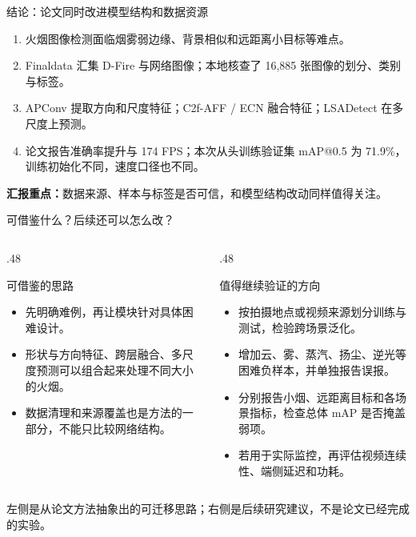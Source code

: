 \documentclass[aspectratio=169,10pt]{ctexbeamer}
\begin{document}
\begin{frame}{结论：论文同时改进模型结构和数据资源}
\begin{enumerate}
\item 火烟图像检测面临烟雾弱边缘、背景相似和远距离小目标等难点。
\item Finaldata 汇集 D-Fire 与网络图像；本地核查了 16,885 张图像的划分、类别与标签。
\item APConv 提取方向和尺度特征；C2f-AFF / ECN 融合特征；LSADetect 在多尺度上预测。
\item 论文报告准确率提升与 174 FPS；本次从头训练验证集 mAP@0.5 为 71.9\%，训练初始化不同，速度口径也不同。
\end{enumerate}
\vspace{.25cm}\textbf{汇报重点：}数据来源、样本与标签是否可信，和模型结构改动同样值得关注。
\end{frame}

\begin{frame}{可借鉴什么？后续还可以怎么改？}
\begin{columns}[T,onlytextwidth]
\begin{column}{.48\textwidth}
\begin{block}{可借鉴的思路}
\begin{itemize}
\item 先明确难例，再让模块针对具体困难设计。
\item 形状与方向特征、跨层融合、多尺度预测可以组合起来处理不同大小的火烟。
\item 数据清理和来源覆盖也是方法的一部分，不能只比较网络结构。
\end{itemize}
\end{block}
\end{column}
\begin{column}{.48\textwidth}
\begin{block}{值得继续验证的方向}
\begin{itemize}
\item 按拍摄地点或视频来源划分训练与测试，检验跨场景泛化。
\item 增加云、雾、蒸汽、扬尘、逆光等困难负样本，并单独报告误报。
\item 分别报告小烟、远距离目标和各场景指标，检查总体 mAP 是否掩盖弱项。
\item 若用于实际监控，再评估视频连续性、端侧延迟和功耗。
\end{itemize}
\end{block}
\end{column}
\end{columns}
\vspace{.2cm}\small 左侧是从论文方法抽象出的可迁移思路；右侧是后续研究建议，不是论文已经完成的实验。
\end{frame}
\end{document}
